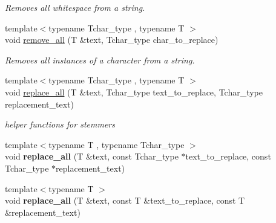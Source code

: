 \begin{DoxyCompactItemize}
\begin{DoxyCompactList}\small\item\em Removes all whitespace from a string. \end{DoxyCompactList}\item 
\hypertarget{namespacestring__util_a2f89ea80d36d58f12a5b156aa91d43aa}{{\footnotesize template$<$typename Tchar\-\_\-type , typename T $>$ }\\void \hyperlink{namespacestring__util_a2f89ea80d36d58f12a5b156aa91d43aa}{remove\-\_\-all} (T \&text, Tchar\-\_\-type char\-\_\-to\-\_\-replace)}\label{namespacestring__util_a2f89ea80d36d58f12a5b156aa91d43aa}

\begin{DoxyCompactList}\small\item\em Removes all instances of a character from a string. \end{DoxyCompactList}\item 
\hypertarget{namespacestring__util_a10ec640d61f1209f2e47cd91504061d3}{{\footnotesize template$<$typename Tchar\-\_\-type , typename T $>$ }\\void \hyperlink{namespacestring__util_a10ec640d61f1209f2e47cd91504061d3}{replace\-\_\-all} (T \&text, Tchar\-\_\-type text\-\_\-to\-\_\-replace, Tchar\-\_\-type replacement\-\_\-text)}\label{namespacestring__util_a10ec640d61f1209f2e47cd91504061d3}

\begin{DoxyCompactList}\small\item\em helper functions for stemmers \end{DoxyCompactList}\item 
\hypertarget{namespacestring__util_a066971cc89a67e380df6098d90237ff2}{{\footnotesize template$<$typename T , typename Tchar\-\_\-type $>$ }\\void {\bfseries replace\-\_\-all} (T \&text, const Tchar\-\_\-type $\ast$text\-\_\-to\-\_\-replace, const Tchar\-\_\-type $\ast$replacement\-\_\-text)}\label{namespacestring__util_a066971cc89a67e380df6098d90237ff2}

\item 
\hypertarget{namespacestring__util_abd789a33fdd13f1b7de04904d164d413}{{\footnotesize template$<$typename T $>$ }\\void {\bfseries replace\-\_\-all} (T \&text, const T \&text\-\_\-to\-\_\-replace, const T \&replacement\-\_\-text)}\label{namespacestring__util_abd789a33fdd13f1b7de04904d164d413}


\end{DoxyCompactItemize}
